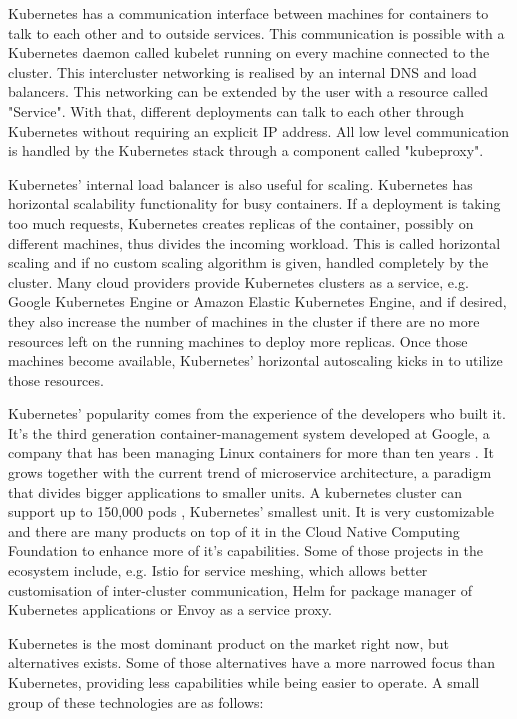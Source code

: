 Kubernetes has a communication interface between machines for containers to talk to each other and to outside services. This communication is possible with a Kubernetes daemon called kubelet running on every machine connected to the cluster. This intercluster networking is realised by an internal DNS and load balancers. This networking can be extended by the user with a resource called "Service". With that, different deployments can talk to each other through Kubernetes without requiring an explicit IP address. All low level communication is handled by the Kubernetes stack through a component called "kubeproxy".

Kubernetes' internal load balancer is also useful for scaling. Kubernetes has horizontal scalability functionality for busy containers. If a deployment is taking too much requests, Kubernetes creates replicas of the container, possibly on different machines, thus divides the incoming workload. This is called horizontal scaling and if no custom scaling algorithm is given, handled completely by the cluster. Many cloud providers provide Kubernetes clusters as a service, e.g. Google Kubernetes Engine or Amazon Elastic Kubernetes Engine, and if desired, they also increase the number of machines in the cluster if there are no more resources left on the running machines to deploy more replicas. Once those machines become available, Kubernetes' horizontal autoscaling kicks in to utilize those resources.

Kubernetes' popularity comes from the experience of the developers who built it. It's the third generation container-management system developed at Google, a company that has been managing Linux containers for more than ten years \cite{acm-borg}. It grows together with the current trend of microservice architecture, a paradigm that divides bigger applications to smaller units. A kubernetes cluster can support up to 150,000 pods \cite{kubernetes-load}, Kubernetes' smallest unit. It is very customizable and there are many products on top of it in the Cloud Native Computing Foundation to enhance more of it's capabilities. Some of those projects in the ecosystem include, e.g. Istio for service meshing, which allows better customisation of inter-cluster communication, Helm for package manager of Kubernetes applications or Envoy as a service proxy.

Kubernetes is the most dominant product on the market right now, but alternatives exists. Some of those alternatives have a more narrowed focus than Kubernetes, providing less capabilities while being easier to operate. A small group of these technologies are as follows:


